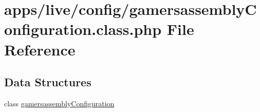 \hypertarget{gamersassembly_configuration_8class_8php}{\section{apps/live/config/gamersassembly\-Configuration.class.\-php File Reference}
\label{gamersassembly_configuration_8class_8php}
}
\subsection*{Data Structures}
\begin{DoxyCompactItemize}
\item 
class \hyperlink{classgamersassembly_configuration}{gamersassembly\-Configuration}
\end{DoxyCompactItemize}
